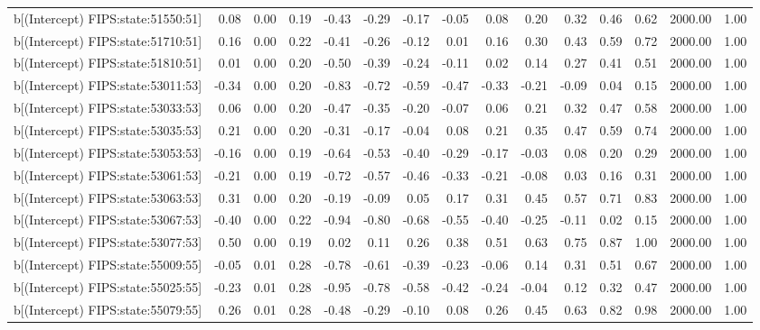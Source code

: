 \begin{table}[ht]
\begin{tabular}{rrrrrrrrrrrrrrr}
  b[(Intercept) FIPS:state:51550:51] & 0.08 & 0.00 & 0.19 & -0.43 & -0.29 & -0.17 & -0.05 & 0.08 & 0.20 & 0.32 & 0.46 & 0.62 & 2000.00 & 1.00 \\ 
  b[(Intercept) FIPS:state:51710:51] & 0.16 & 0.00 & 0.22 & -0.41 & -0.26 & -0.12 & 0.01 & 0.16 & 0.30 & 0.43 & 0.59 & 0.72 & 2000.00 & 1.00 \\ 
  b[(Intercept) FIPS:state:51810:51] & 0.01 & 0.00 & 0.20 & -0.50 & -0.39 & -0.24 & -0.11 & 0.02 & 0.14 & 0.27 & 0.41 & 0.51 & 2000.00 & 1.00 \\ 
  b[(Intercept) FIPS:state:53011:53] & -0.34 & 0.00 & 0.20 & -0.83 & -0.72 & -0.59 & -0.47 & -0.33 & -0.21 & -0.09 & 0.04 & 0.15 & 2000.00 & 1.00 \\ 
  b[(Intercept) FIPS:state:53033:53] & 0.06 & 0.00 & 0.20 & -0.47 & -0.35 & -0.20 & -0.07 & 0.06 & 0.21 & 0.32 & 0.47 & 0.58 & 2000.00 & 1.00 \\ 
  b[(Intercept) FIPS:state:53035:53] & 0.21 & 0.00 & 0.20 & -0.31 & -0.17 & -0.04 & 0.08 & 0.21 & 0.35 & 0.47 & 0.59 & 0.74 & 2000.00 & 1.00 \\ 
  b[(Intercept) FIPS:state:53053:53] & -0.16 & 0.00 & 0.19 & -0.64 & -0.53 & -0.40 & -0.29 & -0.17 & -0.03 & 0.08 & 0.20 & 0.29 & 2000.00 & 1.00 \\ 
  b[(Intercept) FIPS:state:53061:53] & -0.21 & 0.00 & 0.19 & -0.72 & -0.57 & -0.46 & -0.33 & -0.21 & -0.08 & 0.03 & 0.16 & 0.31 & 2000.00 & 1.00 \\ 
  b[(Intercept) FIPS:state:53063:53] & 0.31 & 0.00 & 0.20 & -0.19 & -0.09 & 0.05 & 0.17 & 0.31 & 0.45 & 0.57 & 0.71 & 0.83 & 2000.00 & 1.00 \\ 
  b[(Intercept) FIPS:state:53067:53] & -0.40 & 0.00 & 0.22 & -0.94 & -0.80 & -0.68 & -0.55 & -0.40 & -0.25 & -0.11 & 0.02 & 0.15 & 2000.00 & 1.00 \\ 
  b[(Intercept) FIPS:state:53077:53] & 0.50 & 0.00 & 0.19 & 0.02 & 0.11 & 0.26 & 0.38 & 0.51 & 0.63 & 0.75 & 0.87 & 1.00 & 2000.00 & 1.00 \\ 
  b[(Intercept) FIPS:state:55009:55] & -0.05 & 0.01 & 0.28 & -0.78 & -0.61 & -0.39 & -0.23 & -0.06 & 0.14 & 0.31 & 0.51 & 0.67 & 2000.00 & 1.00 \\ 
  b[(Intercept) FIPS:state:55025:55] & -0.23 & 0.01 & 0.28 & -0.95 & -0.78 & -0.58 & -0.42 & -0.24 & -0.04 & 0.12 & 0.32 & 0.47 & 2000.00 & 1.00 \\ 
  b[(Intercept) FIPS:state:55079:55] & 0.26 & 0.01 & 0.28 & -0.48 & -0.29 & -0.10 & 0.08 & 0.26 & 0.45 & 0.63 & 0.82 & 0.98 & 2000.00 & 1.00 \\ 

\end{tabular}
\end{table}
